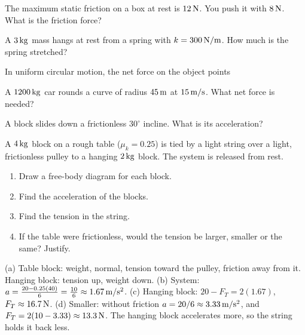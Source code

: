 \begin{exo}{}
The maximum static friction on a box at rest is $12\,\mathrm{N}$. You push it with $8\,\mathrm{N}$. What is the friction force?
\end{exo}
\begin{exo}{}
A $3\,\mathrm{kg}$ mass hangs at rest from a spring with $k=300\,\mathrm{N/m}$. How much is the spring stretched?
\choices{$1\m$}{$0.1\m$}{$0.01\m$}{$10\m$}
\end{exo}
\begin{exo}{}
In uniform circular motion, the net force on the object points
\end{exo}
\begin{exo}{}
A $1200\,\mathrm{kg}$ car rounds a curve of radius $45\,\mathrm{m}$ at $15\,\mathrm{m/s}$. What net force is needed?
\end{exo}
\begin{exo}{}
A block slides down a frictionless $30^\circ$ incline. What is its acceleration?
\end{exo}
\begin{exo}{}
A $4\,\mathrm{kg}$ block on a rough table ($\mu_k=0.25$) is tied by a light string over a light, frictionless pulley to a hanging $2\,\mathrm{kg}$ block. The system is released from rest.
\begin{enumerate}[label=(\alph*)]
\item Draw a free-body diagram for each block.
\item Find the acceleration of the blocks.
\item Find the tension in the string.
\item If the table were frictionless, would the tension be larger, smaller or the same? Justify.
\end{enumerate}
\work{6cm}
\begin{solution}
(a) Table block: weight, normal, tension toward the pulley, friction away from it. Hanging block: tension up, weight down. \;(b) System: $a=\frac{20-0.25(40)}{6}=\frac{10}{6}\approx1.67\,\mathrm{m/s^2}$. \;(c) Hanging block: $20-F_T=2(1.67)$, $F_T\approx16.7\,\mathrm{N}$. \;(d) Smaller: without friction $a=20/6\approx3.33\,\mathrm{m/s^2}$, and $F_T=2(10-3.33)\approx13.3\,\mathrm{N}$. The hanging block accelerates more, so the string holds it back less.
\end{solution}
\end{exo}

